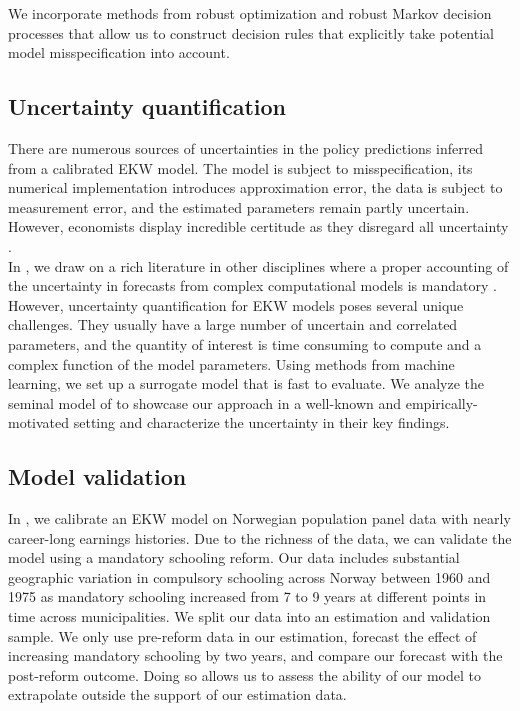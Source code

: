 \noindent We incorporate methods from robust optimization \citep{Ben-Tal.2009,Rahimian.2019,Wiesemann.2014} and robust Markov decision processes \citep{Iyengar.2005,Nilim.2005} that allow us to construct decision rules that explicitly take potential model misspecification into account.
\subsection{Uncertainty quantification}
There are numerous sources of uncertainties in the policy predictions inferred from a calibrated EKW model. The model is subject to misspecification, its numerical implementation introduces approximation error, the data is subject to measurement error, and the estimated parameters remain partly uncertain. However, economists display incredible certitude as they disregard all uncertainty \citep{Manski.2013}.\\

\noindent In \citet{Gabler.2020b}, we draw on a rich literature in other disciplines where a proper accounting of the uncertainty in forecasts from complex computational models is mandatory \citep{Saltelli.2004, Saltelli.2008, Smith.2014}. However, uncertainty quantification for EKW models poses several unique challenges. They usually have a large number of uncertain and correlated parameters, and the quantity of interest is time consuming to compute and a complex function of the model parameters. Using methods from machine learning, we set up a surrogate model that is fast to evaluate. We analyze the seminal model of \citep{Keane.1994, Keane.1997} to showcase our approach in a well-known and empirically-motivated setting and characterize the uncertainty in their key findings.
\subsection{Model validation}
In \citet{Bhuller.2018}, we calibrate an EKW model on Norwegian population panel data with nearly career-long earnings histories. Due to the richness of the data, we can validate the model using a mandatory schooling reform. Our data includes substantial geographic variation in compulsory schooling across Norway between 1960 and 1975 as mandatory schooling increased from 7 to 9 years at different points in time across municipalities. We split our data into an estimation and validation sample. We only use pre-reform data in our estimation, forecast the effect of increasing mandatory schooling by two years, and compare our forecast with the post-reform outcome. Doing so allows us to assess the ability of our model to extrapolate outside the support of our estimation data.\\

